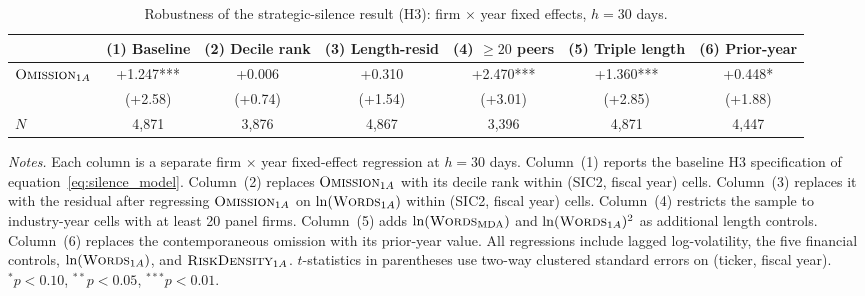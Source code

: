 \begin{table}[htbp]
\centering
\caption{Robustness of the strategic-silence result (H3): firm $\times$ year fixed effects, $h = 30$ days.}
\label{tab:silence_robust}
\footnotesize
\setlength{\tabcolsep}{3pt}
\begin{tabular*}{\textwidth}{@{\extracolsep{\fill}}lcccccc@{}}
\toprule
& (1) Baseline & (2) Decile rank & (3) Length-resid & (4) $\geq 20$ peers & (5) Triple length & (6) Prior-year \\
\midrule
$\textsc{Omission}_{1A}$ & +1.247*** & +0.006 & +0.310 & +2.470*** & +1.360*** & +0.448* \\
& (+2.58) & (+0.74) & (+1.54) & (+3.01) & (+2.85) & (+1.88) \\
$N$ & 4,871 & 3,876 & 4,867 & 3,396 & 4,871 & 4,447 \\
\bottomrule
\end{tabular*}
\par\smallskip
\begin{flushleft}\footnotesize
\textit{Notes.} Each column is a separate firm $\times$ year fixed-effect regression at $h = 30$ days. Column~(1) reports the baseline H3 specification of equation~\ref{eq:silence_model}. Column~(2) replaces $\textsc{Omission}_{1A}$ with its decile rank within (SIC2, fiscal year) cells. Column~(3) replaces it with the residual after regressing $\textsc{Omission}_{1A}$ on $\ln(\textsc{Words}_{1A})$ within (SIC2, fiscal year) cells. Column~(4) restricts the sample to industry-year cells with at least 20 panel firms. Column~(5) adds $\ln(\textsc{Words}_{\mathrm{MDA}})$ and $\ln(\textsc{Words}_{1A})^2$ as additional length controls. Column~(6) replaces the contemporaneous omission with its prior-year value. All regressions include lagged log-volatility, the five financial controls, $\ln(\textsc{Words}_{1A})$, and $\textsc{RiskDensity}_{1A}$. $t$-statistics in parentheses use two-way clustered standard errors on (ticker, fiscal year). $^{*}p<0.10$, $^{**}p<0.05$, $^{***}p<0.01$.
\end{flushleft}
\end{table}
